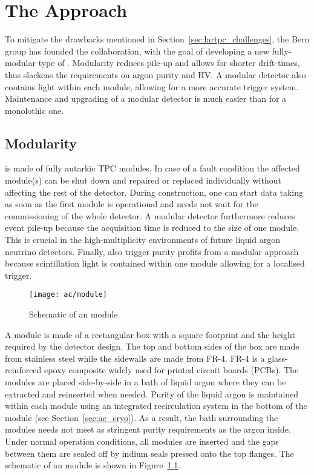 \chapter{The \AC{} Approach}
\label{chap:argoncube}

To mitigate the drawbacks mentioned in Section~\ref{sec:lartpc_challenges}, the Bern group has founded the \AC{} collaboration, with the goal of developing a new fully-modular type of \lartpc{}.
Modularity reduces pile-up and allows for shorter drift-times, thus slackens the requirements on argon purity and HV.
A modular detector also contains light within each module, allowing for a more accurate trigger system.
Maintenance and upgrading of a modular detector is much easier than for a monolothic one.


\section{Modularity}
\label{sec:ac_modularity}

\AC{} is made of fully autarkic TPC modules.
In case of a fault condition the affected module(s) can be shut down and repaired or replaced individually without affecting the rest of the detector.
During construction, one can start data taking as soon as the first module is operational and needs not wait for the commissioning of the whole detector.
A modular detector furthermore reduces event pile-up because the acquisition time is reduced to the size of one module.
This is crucial in the high-multiplicity environments of future liquid argon neutrino detectors.
Finally, also trigger purity profits from a modular approach because scintillation light is contained within one module allowing for a localised trigger.

\begin{figure}[htb]
	\centering
	\texttt{[image: ac/module]}
	\caption{Schematic of an \AC{} module}
	\label{fig:ac_module}
\end{figure}

A module is made of a rectangular box with a square footprint and the height required by the detector design.
The top and bottom sides of the box are made from stainless steel while the sidewalls are made from FR-4.
FR-4 is a glass-reinforced epoxy composite widely used for printed circuit boards (PCBs).
The modules are placed side-by-side in a bath of liquid argon where they can be extracted and reinserted when needed.
Purity of the liquid argon is maintained within each module using an integrated recirculation system in the bottom of the module (see Section~\ref{sec:ac_cryo}).
As a result, the bath surrounding the modules needs not meet as stringent purity requirements as the argon inside.
Under normal operation conditions, all modules are inserted and the gaps between them are sealed off by indium seals pressed onto the top flanges.
The schematic of an \AC{} module is shown in Figure~\ref{fig:ac_module}.

